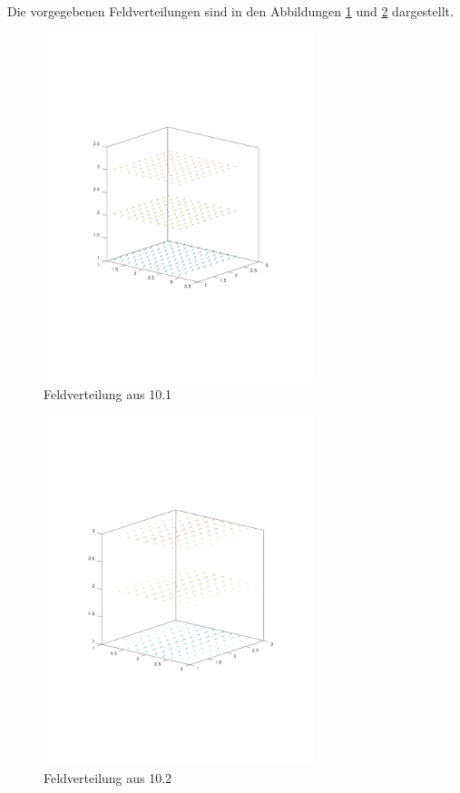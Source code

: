 \documentclass[Protokollheft.tex]{subfiles}
\begin{document}
	Die vorgegebenen Feldverteilungen sind in den Abbildungen \ref{Abb:10_1} und \ref{Abb:10_2} dargestellt.

	\begin{figure}[h]
		\centering
		\includegraphics[trim = 15mm 65mm 15mm 60mm, clip, width=0.7\textwidth]{10_1.pdf}
		\caption{Feldverteilung aus 10.1}
		\label{Abb:10_1}
	\end{figure}
	
	\begin{figure}[h]
		\centering
		\includegraphics[trim = 15mm 65mm 15mm 60mm, clip, width=0.7\textwidth]{10_2.pdf}
		\caption{Feldverteilung aus 10.2}
		\label{Abb:10_2}
	\end{figure}
\end{document}
